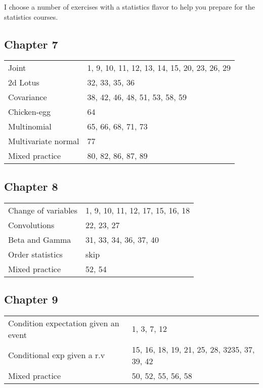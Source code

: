 \documentclass[a4paper]{article}
\theoremstyle{definition}
\newcommand{\1}[1]{\,I_{#1}} %
\begin{document}
I choose a number of exercises with a statistics flavor to help you prepare for the statistics courses. 


\subsection{Chapter 7}
\label{sec:orgfb2e2c8}

\begin{center}
\begin{tabular}{ll}
\hline
Joint & 1, 9, 10, 11, 12, 13, 14, 15, 20, 23, 26, 29\\
2d Lotus & 32, 33, 35, 36\\
Covariance & 38, 42, 46, 48, 51, 53, 58, 59\\
Chicken-egg & 64\\
Multinomial & 65, 66, 68, 71, 73\\
Multivariate normal & 77\\
Mixed practice & 80, 82, 86, 87, 89\\
\hline
\end{tabular}
\end{center}

\subsection{Chapter 8}
\label{sec:orgdab2853}

\begin{center}
\begin{tabular}{ll}
\hline
Change of variables & 1, 9, 10, 11, 12, 17, 15, 16, 18\\
Convolutions & 22, 23, 27\\
Beta and Gamma & 31, 33, 34, 36, 37, 40\\
Order statistics & skip\\
Mixed practice & 52, 54\\
\hline
\end{tabular}
\end{center}

\subsection{Chapter 9}
\label{sec:org9446ebb}

\begin{center}
\begin{tabular}{ll}
\hline
Condition expectation given an event & 1, 3, 7, 12\\
Conditional exp given a r.v & 15, 16, 18, 19, 21, 25, 28, 3235, 37, 39, 42\\
Mixed practice & 50, 52, 55, 56, 58\\
\hline
\end{tabular}
\end{center}
\end{document}
